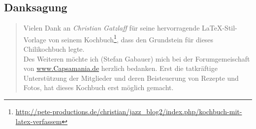 
\subsection*{\centering Danksagung}
\begin{quote}
Vielen Dank an \emph{Christian Gatzlaff} f\"ur seine hervorragende \LaTeX-Stil-Vorlage von seinem Kochbuch\footnote{\url{http://pete-productions.de/christian/jazz_blog2/index.php/kochbuch-mit-latex-verfassem}}, dass den Grundstein f\"ur dieses Chilikochbuch legte.\\

Des Weiteren m\"ochte ich (Stefan Gabauer) mich bei der Forumgemeischaft von \url{www.Capsamania.de} herzlich bedanken. Erst die tatkr\"aftige Unterst\"utzung der Mitglieder und deren Beisteuerung von Rezepte und Fotos, hat dieses Kochbuch erst m\"oglich gemacht.
\end{quote}
